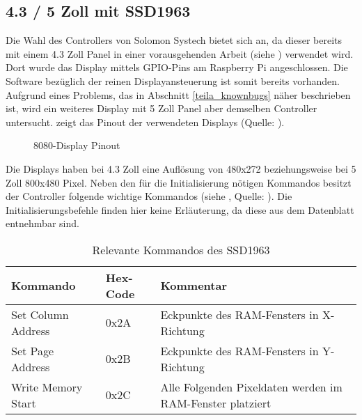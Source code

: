 \subsection{4.3 / 5 Zoll mit SSD1963}
Die Wahl des Controllers  von Solomon Systech bietet sich an, da dieser bereits mit einem 4.3 Zoll  Panel in einer vorausgehenden Arbeit (siehe \cite{Schlegel2013a}) verwendet wird. Dort wurde das Display mittels GPIO-Pins am Raspberry Pi angeschlossen. Die Software bezüglich der reinen Displayansteuerung ist somit bereits vorhanden. Aufgrund eines Problems, das in Abschnitt \ref{teila_knownbugs} näher beschrieben ist, wird ein weiteres Display mit 5 Zoll Panel aber demselben Controller untersucht. 
 zeigt das Pinout der verwendeten Displays (Quelle: \cite{Coldtears2014}).
\begin{figure}[h]
	\centering
{}
	\caption{8080-Display Pinout}
	\label{fig:8080_pinout}
\end{figure}
Die Displays haben bei 4.3 Zoll eine Auflösung von 480x272 beziehungsweise bei 5 Zoll 800x480 Pixel. Neben den für die Initialisierung nötigen Kommandos besitzt der Controller folgende wichtige Kommandos (siehe , Quelle: \cite{SSD2008}). Die Initialisierungsbefehle finden hier keine Erläuterung, da diese aus dem Datenblatt entnehmbar sind.
\begin{table}[h]
\begin{tabular}{|p{4cm}|p{1cm}|p{8cm}|}\hline
\rowcolor{TableBackgroundColor} 
   \textbf{Kommando} & \textbf{Hex-Code} & \textbf{Kommentar}\\ \hline
   Set Column Address & 0x2A & Eckpunkte des RAM-Fensters in X-Richtung \\ \hline
   Set Page Address & 0x2B & Eckpunkte des RAM-Fensters in Y-Richtung \\ \hline
   Write Memory Start & 0x2C & Alle Folgenden Pixeldaten werden im RAM-Fenster platziert \\ \hline
\end{tabular}
\caption{Relevante Kommandos des SSD1963}
\label{tab:Kommandos_SSD1963}
\end{table}
